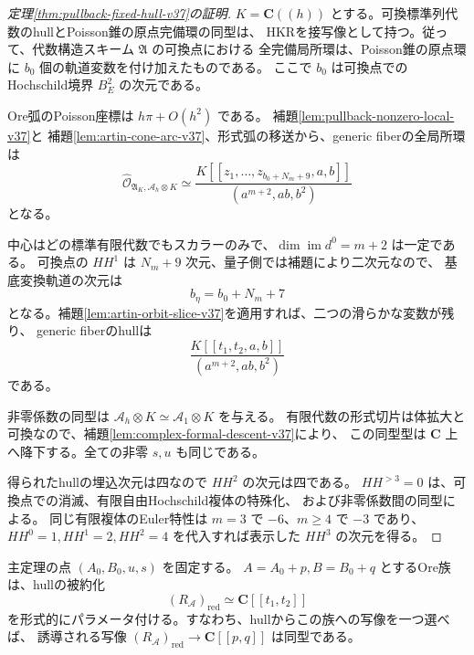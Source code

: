\begin{proof}[定理\ref{thm:pullback-fixed-hull-v37}の証明]
$K=\mathbf C((h))$ とする。可換標準列代数のhullとPoisson錐の原点完備環の同型は、
HKRを接写像として持つ。従って、代数構造スキーム $\mathfrak A$ の可換点における
全完備局所環は、Poisson錐の原点環に $b_0$ 個の軌道変数を付け加えたものである。
ここで $b_0$ は可換点でのHochschild境界 $B_E^2$ の次元である。

Ore弧のPoisson座標は $h\pi+O(h^2)$ である。
補題\ref{lem:pullback-nonzero-local-v37}と
補題\ref{lem:artin-cone-arc-v37}、形式弧の移送から、generic fiberの全局所環は
\[
 \widehat{\mathcal O}_{\mathfrak A_K,\mathcal A_h\otimes K}
 \simeq
 \frac{K[[z_1,\ldots,z_{b_0+N_m+9},a,b]]}{(a^{m+2},ab,b^2)}
\]
となる。

中心はどの標準有限代数でもスカラーのみで、$\dim\operatorname{im}d^0=m+2$ は一定である。
可換点の $HH^1$ は $N_m+9$ 次元、量子側では補題により二次元なので、
基底変換軌道の次元は
\[
 b_\eta=b_0+N_m+7
\]
となる。補題\ref{lem:artin-orbit-slice-v37}を適用すれば、二つの滑らかな変数が残り、
generic fiberのhullは
\[
 \frac{K[[t_1,t_2,a,b]]}{(a^{m+2},ab,b^2)}
\]
である。

非零係数の同型は $\mathcal A_h\otimes K\simeq\mathcal A_1\otimes K$ を与える。
有限代数の形式切片は体拡大と可換なので、補題\ref{lem:complex-formal-descent-v37}により、
この同型型は $\mathbf C$ 上へ降下する。全ての非零 $s,u$ も同じである。

得られたhullの埋込次元は四なので $HH^2$ の次元は四である。
$HH^{>3}=0$ は、可換点での消滅、有限自由Hochschild複体の特殊化、
および非零係数間の同型による。
同じ有限複体のEuler特性は $m=3$ で $-6$、$m\ge4$ で $-3$ であり、
$HH^0=1,HH^1=2,HH^2=4$ を代入すれば表示した $HH^3$ の次元を得る。
\end{proof}

\begin{corollary}[二つの滑らかな方向の明示実現]
\label{cor:pullback-reduced-parameters-v37}
主定理の点 $(A_0,B_0,u,s)$ を固定する。
$A=A_0+p,B=B_0+q$ とするOre族は、hullの被約化
\[
 (R_{\mathcal A})_{\mathrm{red}}\simeq\mathbf C[[t_1,t_2]]
\]
を形式的にパラメータ付ける。すなわち、hullからこの族への写像を一つ選べば、
誘導される写像
$(R_{\mathcal A})_{\mathrm{red}}\longrightarrow\mathbf C[[p,q]]$
は同型である。
\end{corollary}


